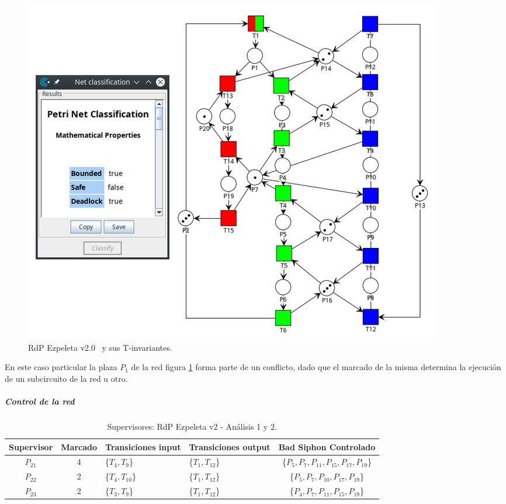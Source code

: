 \begin{figure}[H]
	\centering
	\includegraphics[width=\textwidth]{Figures/algoritmo4/ezpeleta_v2_imag1.png}
	\caption[RdP Ezpeleta v2.0 y sus T-invariantes.]{RdP Ezpeleta v2.0 \footnotemark \ y sus T-invariantes.}
	\label{fig:Rdp-Ezpeletav2v4}
\end{figure} 

En este caso particular la plaza $P_1$ de la red figura \ref{fig:Rdp-Ezpeletav2v4} forma parte de un conflicto, dado que el marcado de la misma determina la ejecución de un subcircuito de la red u otro.
\bigskip

\subparagraph{Control de la red}
\hfill

\begin{table}[H]
    \centering
    \begin{tabular}{|c|c|P{2.2cm}|P{2.2cm}|c|}
    \hline
    \textbf{Supervisor} & \textbf{Marcado} & \textbf{Transiciones input} & \textbf{Transiciones output} & \textbf{Bad Siphon Controlado}  \\  \hline
    $P_{21}$ & 4 & \{$T_{4}, T_{9}$\} & \{$T_{1}, T_{12}$\} & \{$P_5, P_{7}, P_{11}, P_{15}, P_{17}, P_{19}$\} \\ 
    \hline
    $P_{22}$ & 2 & \{$T_{4}, T_{10}$\} & \{$T_{1}, T_{12}$\} & \{$P_{5},P_{7},P_{10},P_{17}, P_{19}$\} \\ 
    \hline
    $P_{23}$ & 2 & \{$T_{3}, T_{9}$\} & \{$T_{1}, T_{12}$\} & \{$P_{4},P_{7},P_{11},P_{15}, P_{19}$\} \\ 
    \hline
    \end{tabular}
    \caption{Supervisores: RdP Ezpeleta v2 - Análisis 1 y 2.}
    \label{tab:Ezpeletav212-v4}
\end{table}

